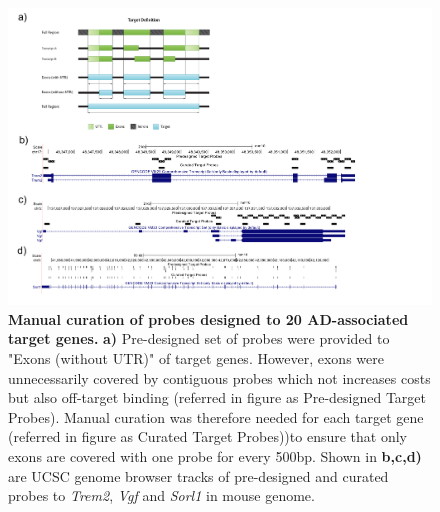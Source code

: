\begin{landscape}
	\begin{figure}[ht]
		\begin{center}
			\includegraphics[page=1,trim={0cm 2cm 0cm 0cm},clip,scale = 0.70]{Figures/TargetProbes_Visualisation.pdf}
		\end{center}
		\captionsetup{width=1.5\textwidth}
		\caption[Manual curation of probes designed to 20 AD-associated target genes]%
		{\textbf{Manual curation of probes designed to 20 AD-associated target genes.} \textbf{a)} Pre-designed set of probes were provided to "Exons (without UTR)" of target genes. However, exons were unnecessarily covered by contiguous probes which not increases costs but also off-target binding (referred in figure as Pre-designed Target Probes). Manual curation was therefore needed for each target gene (referred in figure as Curated Target Probes))to ensure that only exons are covered with one probe for every 500bp. Shown in \textbf{b,c,d)} are UCSC genome browser tracks of pre-designed and curated probes to \textit{Trem2}, \textit{Vgf} and \textit{Sorl1} in mouse genome. }
		\label{fig:target_probes_eg}
	\end{figure}
\end{landscape}


